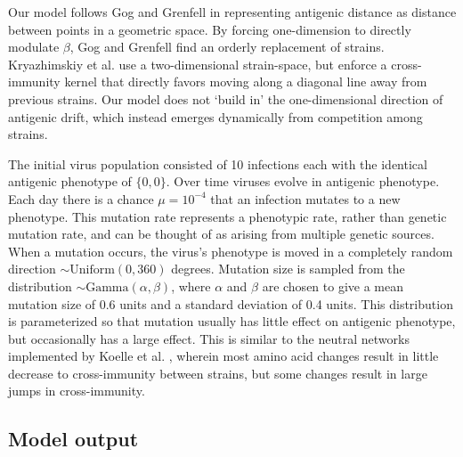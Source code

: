 Our model follows Gog and Grenfell  in representing antigenic distance as distance between points in a geometric space.  By forcing one-dimension to directly modulate $\beta$, Gog and Grenfell find an orderly replacement of strains.  Kryazhimskiy et al.  use a two-dimensional strain-space, but enforce a cross-immunity kernel that directly favors moving along a diagonal line away from previous strains.  Our model does not `build in' the one-dimensional direction of antigenic drift, which instead emerges dynamically from competition among strains.

The initial virus population consisted of 10 infections each with the identical antigenic phenotype of $\{0,0\}$.  Over time viruses evolve in antigenic phenotype.  Each day there is a chance $\mu = 10^{-4}$ that an infection mutates to a new phenotype.  This mutation rate represents a phenotypic rate, rather than genetic mutation rate, and can be thought of as arising from multiple genetic sources.  When a mutation occurs, the virus's phenotype is moved in a completely random direction $\sim \textrm{Uniform}(0,360)$ degrees. Mutation size is sampled from the distribution $\sim \textrm{Gamma}(\alpha,\beta)$, where $\alpha$ and $\beta$ are chosen to give a mean mutation size of 0.6 units and a standard deviation of 0.4 units.  This distribution is parameterized so that mutation usually has little effect on antigenic phenotype, but occasionally has a large effect.  This is similar to the neutral networks implemented by Koelle et al. \cite{Koelle06}, wherein most amino acid changes result in little decrease to cross-immunity between strains, but some changes result in large jumps in cross-immunity.

\subsection*{Model output}

